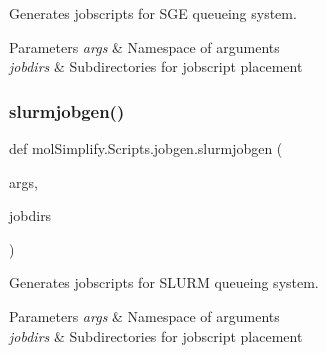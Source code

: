 Generates jobscripts for S\+GE queueing system. 


\begin{DoxyParams}{Parameters}
{\em args} & Namespace of arguments \\
\hline
{\em jobdirs} & Subdirectories for jobscript placement \\
\hline
\end{DoxyParams}
\mbox{\label{namespacemolSimplify_1_1Scripts_1_1jobgen_a7d74dcbceb75d7adbeb197f5260935c2}} 
\subsubsection{\texorpdfstring{slurmjobgen()}{slurmjobgen()}}
{\footnotesize\ttfamily def mol\+Simplify.\+Scripts.\+jobgen.\+slurmjobgen (\begin{DoxyParamCaption}\item[{}]{args,  }\item[{}]{jobdirs }\end{DoxyParamCaption})}



Generates jobscripts for S\+L\+U\+RM queueing system. 


\begin{DoxyParams}{Parameters}
{\em args} & Namespace of arguments \\
\hline
{\em jobdirs} & Subdirectories for jobscript placement \\
\hline
\end{DoxyParams}
